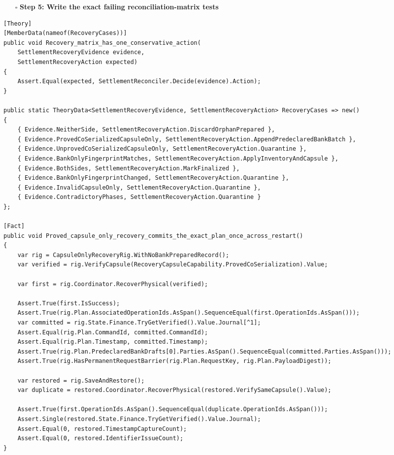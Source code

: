 \documentclass[
  10pt,
  letterpaper,
]{article}
\providecommand{\tightlist}{%
  \setlength{\itemsep}{0pt}\setlength{\parskip}{0pt}}
\begin{document}
\begin{itemize}
\tightlist
\item[$\square$]
  \textbf{Step 5: Write the exact failing reconciliation-matrix tests}
\end{itemize}

\begin{lstlisting}
[Theory]
[MemberData(nameof(RecoveryCases))]
public void Recovery_matrix_has_one_conservative_action(
    SettlementRecoveryEvidence evidence,
    SettlementRecoveryAction expected)
{
    Assert.Equal(expected, SettlementReconciler.Decide(evidence).Action);
}

public static TheoryData<SettlementRecoveryEvidence, SettlementRecoveryAction> RecoveryCases => new()
{
    { Evidence.NeitherSide, SettlementRecoveryAction.DiscardOrphanPrepared },
    { Evidence.ProvedCoSerializedCapsuleOnly, SettlementRecoveryAction.AppendPredeclaredBankBatch },
    { Evidence.UnprovedCoSerializedCapsuleOnly, SettlementRecoveryAction.Quarantine },
    { Evidence.BankOnlyFingerprintMatches, SettlementRecoveryAction.ApplyInventoryAndCapsule },
    { Evidence.BothSides, SettlementRecoveryAction.MarkFinalized },
    { Evidence.BankOnlyFingerprintChanged, SettlementRecoveryAction.Quarantine },
    { Evidence.InvalidCapsuleOnly, SettlementRecoveryAction.Quarantine },
    { Evidence.ContradictoryPhases, SettlementRecoveryAction.Quarantine }
};

[Fact]
public void Proved_capsule_only_recovery_commits_the_exact_plan_once_across_restart()
{
    var rig = CapsuleOnlyRecoveryRig.WithNoBankPreparedRecord();
    var verified = rig.VerifyCapsule(RecoveryCapsuleCapability.ProvedCoSerialization).Value;

    var first = rig.Coordinator.RecoverPhysical(verified);

    Assert.True(first.IsSuccess);
    Assert.True(rig.Plan.AssociatedOperationIds.AsSpan().SequenceEqual(first.OperationIds.AsSpan()));
    var committed = rig.State.Finance.TryGetVerified().Value.Journal[^1];
    Assert.Equal(rig.Plan.CommandId, committed.CommandId);
    Assert.Equal(rig.Plan.Timestamp, committed.Timestamp);
    Assert.True(rig.Plan.PredeclaredBankDrafts[0].Parties.AsSpan().SequenceEqual(committed.Parties.AsSpan()));
    Assert.True(rig.HasPermanentRequestBarrier(rig.Plan.RequestKey, rig.Plan.PayloadDigest));

    var restored = rig.SaveAndRestore();
    var duplicate = restored.Coordinator.RecoverPhysical(restored.VerifySameCapsule().Value);

    Assert.True(first.OperationIds.AsSpan().SequenceEqual(duplicate.OperationIds.AsSpan()));
    Assert.Single(restored.State.Finance.TryGetVerified().Value.Journal);
    Assert.Equal(0, restored.TimestampCaptureCount);
    Assert.Equal(0, restored.IdentifierIssueCount);
}
\end{lstlisting}
\end{document}
